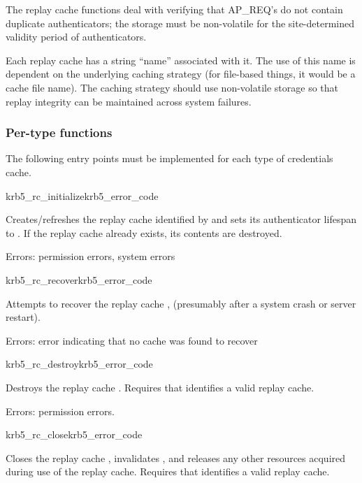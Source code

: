 The replay cache functions deal with verifying that AP_REQ's do not
contain duplicate authenticators; the storage must be non-volatile for
the site-determined validity period of authenticators.

Each replay cache has a string ``name'' associated with it.  The use of
this name is dependent on the underlying caching strategy (for
file-based things, it would be a cache file name).  The
caching strategy should use non-volatile storage so that replay
integrity can be maintained across system failures.

\subsubsection{Per-type functions}
The following entry points must be implemented for each type of
credentials cache.

\begin{funcdecl}{krb5_rc_initialize}{krb5_error_code}{\funcin}
\end{funcdecl}

Creates/refreshes the replay cache identified by  and sets its
authenticator lifespan to .  If the 
replay cache already exists, its contents are destroyed.

Errors: permission errors, system errors

\begin{funcdecl}{krb5_rc_recover}{krb5_error_code}{\funcin}
\end{funcdecl}
Attempts to recover the replay cache , (presumably after a
system crash or server restart).

Errors: error indicating that no cache was found to recover

\begin{funcdecl}{krb5_rc_destroy}{krb5_error_code}{\funcin}
\end{funcdecl}

Destroys the replay cache .
Requires that  identifies a valid replay cache.

Errors: permission errors.

\begin{funcdecl}{krb5_rc_close}{krb5_error_code}{\funcin}
\end{funcdecl}

Closes the replay cache , invalidates ,
and releases any other resources acquired during use of the replay cache.
Requires that  identifies a valid replay cache.

